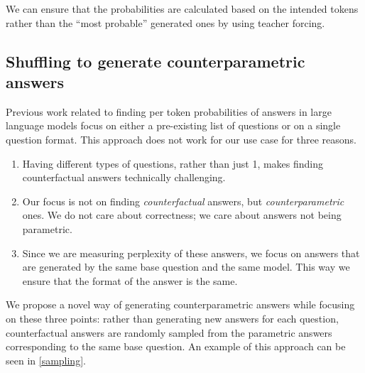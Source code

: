 We can ensure that the probabilities are calculated based on the intended tokens rather than the ``most probable'' generated ones by using teacher forcing\cite{teacher_forcing}.

\subsection{Shuffling to generate counterparametric answers}

Previous work related to finding per token probabilities of answers in large language models focus on either a pre-existing list of questions or on a single question format\cite{factual_recall}.
This approach does not work for our use case for three reasons.
\begin{enumerate}
	\item Having \baseqs{} different types of questions, rather than just 1, makes finding counterfactual answers technically challenging.
	\item Our focus is not on finding \emph{counterfactual} answers, but \emph{counterparametric} ones.
		We do not care about correctness; we care about answers not being parametric.
	\item Since we are measuring perplexity of these answers, we focus on answers that are generated by the same base question and the same model.
		This way we ensure that the format of the answer is the same.
\end{enumerate}

We propose a novel way of generating counterparametric answers while focusing on these three points: rather than generating new answers for each question, counterfactual answers are randomly sampled from the parametric answers corresponding to the same base question.
An example of this approach can be seen in \cref{sampling}.

